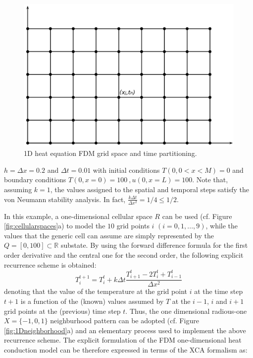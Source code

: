 \begin{figure}
\centering
\includegraphics[scale=0.3]{./images/CA_FDM/fdmgrid}
\caption{1D heat equation FDM grid space and time partitioning.}\label{torus}
\end{figure}
         
    $h = \Delta x = 0.2$ and $\Delta t = 0.01$ with initial
    conditions $T(0, 0 < x < M) = 0$ and boundary conditions $T(0,x=0)
    = 100 \: , u(0,x=L) =100$. Note that, assuming $k=1$, the values
    assigned to the spatial and temporal steps satisfy the von Neumann
    stability analysis. In fact, $\frac{k \Delta t}{\Delta x^2} = 1/4
    \leq 1/2$.
   
        In this example, a one-dimensional cellular space $R$
    can be used (cf. Figure \ref{fig:cellularspaces}a) to model the
    $10$ grid points $i$ $(i = 0, 1, ...,9)$, while the values that
    the generic cell can assume are simply represented by the $Q = [0,
      100] \subset \mathbb{R}$ substate. By using the forward
    difference formula for the first order derivative and the central
    one for the second order, the following explicit recurrence scheme
    is obtained:
    $$ T_i^{t+1} = T_i^t + k \Delta t \frac{T_{i+1}^t - 2T_i^t +
      T_{i-1}^t}{\Delta x^2}
    $$ denoting that the value of the temperature at the grid point
    $i$ at the time step $t+1$ is a function of the (known) values
    assumed by $T$ at the $i-1$, $i$ and $i+1$ grid points at the
    (previous) time step $t$. Thus, the one dimensional radious-one $X
    = \{-1, 0, 1\}$ neighburhood pattern can be adopted (cf. Figure
    \ref{fig:1Dneighborhood}a) and an elementary process used to
    implement the above recurrence scheme. The explicit formulation of
    the FDM one-dimensional heat conduction model can be therefore
    expressed in terms of the XCA formalism as:

